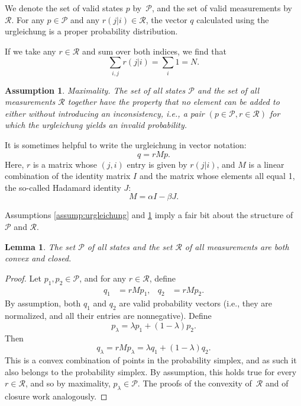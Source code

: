 \documentclass[aps,pra,superscriptaddress,10pt,tightenlines,twocolumn,nofootinbib]{revtex4}
\newtheorem{assump}{Assumption}
\newtheorem{lemma}[theorem]{Lemma}
\theoremstyle{remark}
\newcommand{\ea}[1]{\begin{align}#1\end{align}}
\newcommand{\cP}{\mathcal{P}}
\newcommand{\cR}{\mathcal{R}}
\begin{document}
We denote the set of valid states ${p}$ by~$\cP$, and the set of
valid measurements by~$\cR$.  For any ${p} \in \cP$ and any
$r(j|i) \in \cR$, the vector ${q}$ calculated using the
urgleichung is a proper probability distribution.

If we take any $r \in \cR$ and sum over both indices, we find that
\begin{equation}
\sum_{i,j} r(j|i) = \sum_i 1 = N.
\end{equation}

\begin{assump}
\label{assump:max}
Maximality.  The set of all states $\cP$ and the set of all measurements $\cR$ together have the property that no element can be added to either without introducing an inconsistency, i.e., a pair $(p \in \cP, r \in \cR)$ for which the urgleichung yields an invalid probability.
\end{assump}

It is sometimes helpful to write the urgleichung in vector notation:
\begin{equation}
{q} = rM{p}.
\end{equation}
Here, $r$ is a matrix whose $(j,i)$ entry is given by $r(j|i)$, and
$M$ is a linear combination of the identity matrix $I$ and the matrix
whose elements all equal 1, the so-called Hadamard identity $J$:
\begin{equation}
M = \alpha I - \beta J.
\end{equation}

Assumptions \ref{assump:urgleichung} and \ref{assump:max} imply a fair bit about the structure of~$\cP$ and $\cR$.
\begin{lemma}
\label{lm:convex}
The set $\cP$ of all states and the set $\cR$ of all measurements are both convex and closed.
\end{lemma}
\begin{proof}
Let $p_1,p_2 \in \cP$, and for any $r \in \cR$, define
\ea{
q_1 &= rMp_1, & q_2 &= rMp_2.
}
By assumption, both $q_1$ and $q_2$ are valid probability vectors (i.e., they are normalized, and all their entries are nonnegative).  Define
\begin{equation}
p_\lambda = \lambda p_1 + (1-\lambda)p_2.
\end{equation}
Then
\begin{equation}
q_\lambda = rMp_\lambda = \lambda q_1 + (1-\lambda)q_2.
\end{equation}
This is a convex combination of points in the probability simplex, and as such it also belongs to the probability simplex.  By assumption, this holds true for every $r \in \cR$, and so by maximality, $p_\lambda \in \cP$.  The proofs of the convexity of~$\cR$ and of closure work analogously.
\end{proof}
\end{document}
